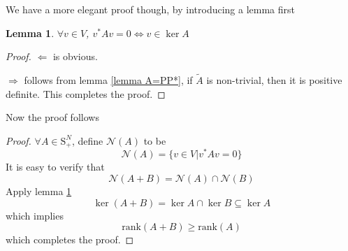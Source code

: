 \documentclass[12pt]{article}
\newtheorem{lemma}{Lemma}
\begin{document}
We have a more elegant proof though, by introducing a lemma first
\begin{lemma}\label{lemma kerA}
	$\forall v\in V$, $v^*Av=0\Leftrightarrow v\in\ker A$
\end{lemma}
\begin{proof}
	$\Leftarrow$ is obvious. 
	
	$\Rightarrow$
	follows from lemma \ref{lemma A=PP*}, if $\tilde{A}$ is non-trivial, then it is positive definite. This completes the proof.
\end{proof}
Now the proof follows
\begin{proof}
	$\forall A\in \mbox{S}_+^N$, define $\mathscr{N}(A)$ to be
	$$\mathscr{N}(A)=\{v\in V|v^*Av=0 \}$$
	It is easy to verify that
	$$\mathscr{N}(A+B)=\mathscr{N}(A)\cap \mathscr{N}(B)$$
	Apply lemma \ref{lemma kerA}
	$$\ker(A+B)=\ker A\cap\ker B\subseteq\ker A$$
	which implies
	$$\mbox{rank}(A+B)\geq\mbox{rank}(A)$$
	which completes the proof.
\end{proof}
\end{document}
